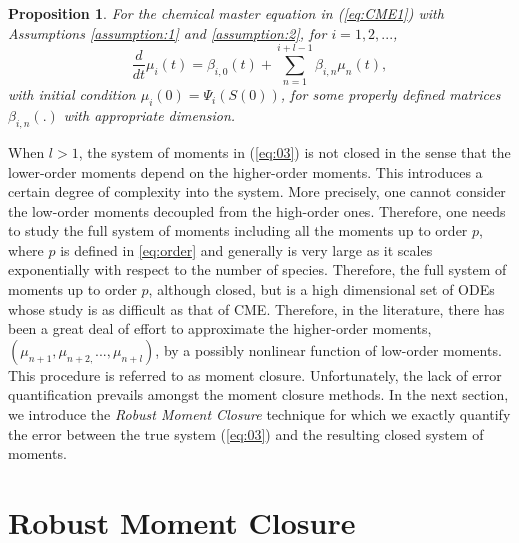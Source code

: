 \documentclass[letterpaper, 10 pt, conference]{ieeeconf}
\newtheorem{proposition}[theorem]{Proposition}
\begin{document}
\begin{proposition}
\label{Prop:01}For the chemical master equation in (\ref{eq:CME1}) with
Assumptions \ref{assumption:1} and \ref{assumption:2}, for $i=1,2,...$, 
\begin{equation}
\frac{d}{dt}\mathbb{\mu }_{i}\left( t\right) =\beta _{i,0}\left( t\right)
+\sum_{n=1}^{i+l-1}\beta _{i,n}\mu _{n}\left( t\right),  \label{eq:03}
\end{equation}
with initial condition $\mu _{i}\left(0\right) =\Psi _{i}\left( S\left(
0\right) \right)$, for some properly defined matrices $\beta _{i,n}\left(
.\right)$ with appropriate dimension.
\end{proposition}

When $l>1$, the system of moments in (\ref{eq:03}) is not closed in the
sense that the lower-order moments depend on the higher-order moments. This
introduces a certain degree of complexity into the system. More precisely,
one cannot consider the low-order moments decoupled from the high-order
ones. Therefore, one needs to study the full system of moments including all
the moments up to order $p$, where $p$ is defined in \ref{eq:order} and
generally is very large as it scales exponentially with respect to the
number of species. Therefore, the full system of moments up to order $p$,
although closed, but is a high dimensional set of ODEs whose study is as
difficult as that of CME. Therefore, in the literature, there has been a
great deal of effort to approximate the higher-order moments, $\left( \mu
_{n+1},\mu _{n+2,}...,\mu _{n+l}\right) $, by a possibly nonlinear function
of low-order moments. This procedure is referred to as moment closure.
Unfortunately, the lack of error quantification prevails amongst the moment
closure methods. In the next section, we introduce the \textit{Robust Moment
Closure} technique for which we exactly quantify the error between the true
system (\ref{eq:03}) and the resulting closed system of moments.

\section{Robust Moment Closure}
\end{document}
